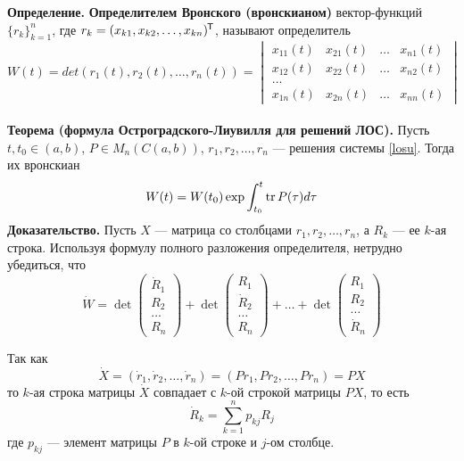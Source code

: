 \noindent \textbf{Определение.} \textbf{Определителем Вронского (вронскианом)} вектор-функций $\{r_k\}_{k=1}^n$, где $r_k=(x_{k1}, x_{k2}, \ldots, x_{kn})^{\mkern-1.5mu\mathsf{T}} $, называют определитель
\begin{equation*}
    W(t) = det(r_1(t),r_2(t),\ldots, r_n(t)) = \begin{vmatrix}
        x_{11}(t) & x_{21}(t) & \ldots & x_{n1}(t) \\
        x_{12}(t) & x_{22}(t) & \ldots & x_{n2}(t) \\
        \ldots                                     \\
        x_{1n}(t) & x_{2n}(t) & \ldots & x_{nn}(t)
    \end{vmatrix}
\end{equation*}
\\
\noindent \textbf{Теорема (формула Остроградского-Лиувилля для решений ЛОС).} Пусть $t, t_0 \in (a,b)$, $P \in M_n(C(a,b))$, $r_1, r_2, \ldots, r_n$ --- решения системы \eqref{losu}. Тогда их вронскиан
\begin{equation*}
    W(t) = W(t_0)\exp \int_{t_0}^t \tr P(\tau)d\tau
\end{equation*}
\textbf{Доказательство.} Пусть $X$ --- матрица со столбцами $r_1, r_2, \ldots, r_n$, а $R_k$ --- ее $k$-ая строка. Используя формулу полного разложения определителя, нетрудно убедиться, что
\begin{equation*}
    \dot{W} = \det\begin{pmatrix}
        \dot{R}_1 \\
        R_2       \\
        \ldots    \\
        R_n
    \end{pmatrix} + \det\begin{pmatrix}
        R_1       \\
        \dot{R}_2 \\
        \ldots    \\
        R_n
    \end{pmatrix} + \ldots + \det\begin{pmatrix}
        R_1    \\
        R_2    \\
        \ldots \\
        \dot{R}_n
    \end{pmatrix}
\end{equation*}

Так как
\begin{equation*}
    \dot{X} = (\dot{r}_1, \dot{r}_2, \ldots, \dot{r}_n) = (Pr_1, Pr_2, \ldots, Pr_n) = PX
\end{equation*}
то $k$-ая строка матрицы $\dot{X}$ совпадает с $k$-ой строкой матрицы $PX$, то есть
\begin{equation*}
    \dot{R}_k = \sum_{k=1}^n p_{kj}R_j
\end{equation*}
где $p_{kj}$ --- элемент матрицы $P$ в $k$-ой строке и $j$-ом столбце.

